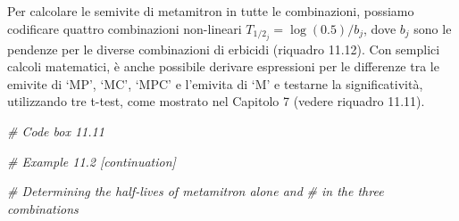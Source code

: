 \documentclass[
  12pt,
]{book}
\newenvironment{Shaded}{\begin{snugshade}}{\end{snugshade}}
\newcommand{\CommentTok}[1]{\textcolor[rgb]{0.56,0.35,0.01}{\textit{#1}}}
\begin{document}
\normalsize

Per calcolare le semivite di metamitron in tutte le combinazioni, possiamo codificare quattro combinazioni non-lineari \(T_{1/2_j} = \log(0.5)/b_j\), dove \(b_j\) sono le pendenze per le diverse combinazioni di erbicidi (riquadro 11.12). Con semplici calcoli matematici, è anche possibile derivare espressioni per le differenze tra le emivite di `MP', `MC', `MPC' e l'emivita di `M' e testarne la significatività, utilizzando tre t-test, come mostrato nel Capitolo 7 (vedere riquadro 11.11).

\vspace{12pt}
\small

\begin{Shaded}
\begin{Highlighting}[]
\CommentTok{\# Code box 11.11}

\CommentTok{\# Example 11.2 [continuation]}

\CommentTok{\# Determining the half{-}lives of metamitron alone and}
\CommentTok{\# in the three combinations}


\end{Highlighting}
\end{Shaded}
\end{document}
